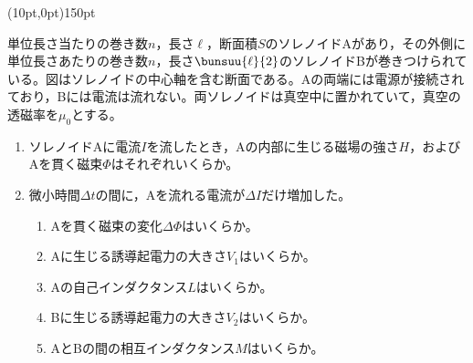 \hakosyokika
\item
    \begin{mawarikomi}(10pt,0pt){150pt}{
        
    }
    単位長さ当たりの巻き数$n$，長さ$\ell $，断面積$S$のソレノイドAがあり，その外側に単位長さあたりの巻き数$n$，長さ$\bunsuu{\ell}{2}$のソレノイドBが巻きつけられている。図はソレノイドの中心軸を含む断面である。Aの両端には電源が接続されており，Bには電流は流れない。両ソレノイドは真空中に置かれていて，真空の透磁率を$\mu _0$とする。
        \begin{enumerate}
            \item ソレノイドAに電流$I$を流したとき，Aの内部に生じる磁場の強さ$H$，およびAを貫く磁束$\varPhi$はそれぞれいくらか。
            \item 微小時間$\varDelta t$の間に，Aを流れる電流が$\varDelta I$だけ増加した。
            \begin{enumerate}[(ア)]
                \item Aを貫く磁束の変化$\varDelta \varPhi $はいくらか。
                \item Aに生じる誘導起電力の大きさ$V_1$はいくらか。
                \item Aの自己インダクタンス$L$はいくらか。
                \item Bに生じる誘導起電力の大きさ$V_2$はいくらか。
                \item AとBの間の相互インダクタンス$M$はいくらか。
            \end{enumerate}
        \end{enumerate}
    \end{mawarikomi}